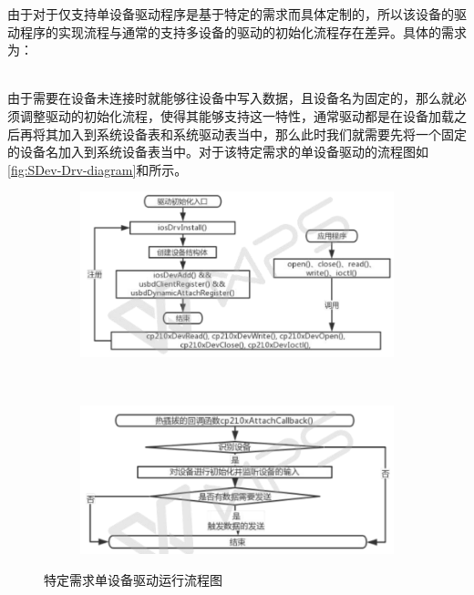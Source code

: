 	由于对于仅支持单设备驱动程序是基于特定的需求而具体定制的，所以该设备的驱动程序的实现流程与通常的支持多设备的驱动的初始化流程存在差异。具体的需求为：\\
\\

	由于需要在设备未连接时就能够往设备中写入数据，且设备名为固定的，那么就必须调整驱动的初始化流程，使得其能够支持这一特性，通常驱动都是在设备加载之后再将其加入到系统设备表和系统驱动表当中，那么此时我们就需要先将一个固定的设备名加入到系统设备表当中。对于该特定需求的单设备驱动的流程图如\autoref{fig:SDev-Drv-diagram}和所示。
\begin{figure}[h]
\centering
  \begin{subfigure}[b]{1.0\textwidth}
  \includegraphics[width=\textwidth]{./graphics/SDev-Drv-Diagram-a.pdf}
  \caption{}\label{fig:SDevice-Driver-diagram-a}
  \end{subfigure}
  ~
  \begin{subfigure}[b]{1.0\textwidth}
  \includegraphics[width=\textwidth]{./graphics/SDev-Drv-Diagram-b.pdf}
  \caption{}\label{fig:SDevice-Driver-diagram-b}
  \end{subfigure}
\caption{特定需求单设备驱动运行流程图}\label{fig:SDev-Drv-diagram}
\end{figure}




